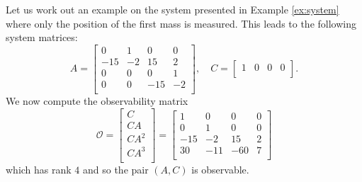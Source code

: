 \begin{example}\label{ex:single-ouptut-observability}
    Let us work out an example on the system presented in Example \ref{ex:system} where only the position of the first mass is measured. This leads to the following system matrices:
\begin{equation*}
    A =
    \begin{bmatrix}
        0 & 1 & 0 & 0 \\
        -15 & -2 & 15 & 2 \\
        0 & 0 & 0 & 1 \\
        0 & 0 & -15 & -2 \\
    \end{bmatrix}, \quad
    C =
    \begin{bmatrix}
        1 & 0 & 0 & 0 \\
    \end{bmatrix}.
\end{equation*}
We now compute the observability matrix
\begin{equation*}
    \mathcal{O} = 
    \begin{bmatrix}
        C \\ CA \\ CA^2 \\ CA^3 \\
    \end{bmatrix} =
    \begin{bmatrix}
        1 & 0 & 0 & 0 \\
        0 & 1 & 0 & 0 \\
        -15 & -2 & 15 & 2 \\
        30 & -11 & -60 & 7 \\
    \end{bmatrix}
\end{equation*}
which has rank $4$ and so the pair $(A,C)$ is observable.
\end{example}

